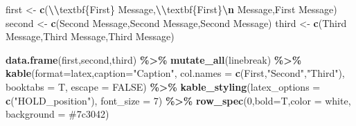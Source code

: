 \documentclass[
  9pt,
  t]{article}
\newenvironment{Shaded}{\begin{snugshade}}{\end{snugshade}}
\newcommand{\AttributeTok}[1]{\textcolor[rgb]{0.13,0.29,0.53}{#1}}
\newcommand{\ConstantTok}[1]{\textcolor[rgb]{0.56,0.35,0.01}{#1}}
\newcommand{\DecValTok}[1]{\textcolor[rgb]{0.00,0.00,0.81}{#1}}
\newcommand{\FunctionTok}[1]{\textcolor[rgb]{0.13,0.29,0.53}{\textbf{#1}}}
\newcommand{\NormalTok}[1]{#1}
\newcommand{\OtherTok}[1]{\textcolor[rgb]{0.56,0.35,0.01}{#1}}
\newcommand{\SpecialCharTok}[1]{\textcolor[rgb]{0.81,0.36,0.00}{\textbf{#1}}}
\newcommand{\StringTok}[1]{\textcolor[rgb]{0.31,0.60,0.02}{#1}}
\begin{document}
\begin{Shaded}
\begin{Highlighting}[]
\NormalTok{first }\OtherTok{\textless{}{-}} \FunctionTok{c}\NormalTok{(}\StringTok{\textquotesingle{}}\SpecialCharTok{\textbackslash{}\textbackslash{}}\StringTok{textbf\{First\} Message\textquotesingle{}}\NormalTok{,}\StringTok{\textquotesingle{}}\SpecialCharTok{\textbackslash{}\textbackslash{}}\StringTok{textbf\{First\}}\SpecialCharTok{\textbackslash{}n}\StringTok{ Message\textquotesingle{}}\NormalTok{,}\StringTok{\textquotesingle{}First Message\textquotesingle{}}\NormalTok{)}
\NormalTok{second }\OtherTok{\textless{}{-}} \FunctionTok{c}\NormalTok{(}\StringTok{\textquotesingle{}Second Message\textquotesingle{}}\NormalTok{,}\StringTok{\textquotesingle{}Second Message\textquotesingle{}}\NormalTok{,}\StringTok{\textquotesingle{}Second Message\textquotesingle{}}\NormalTok{)}
\NormalTok{third }\OtherTok{\textless{}{-}} \FunctionTok{c}\NormalTok{(}\StringTok{\textquotesingle{}Third Message\textquotesingle{}}\NormalTok{,}\StringTok{\textquotesingle{}Third Message\textquotesingle{}}\NormalTok{,}\StringTok{\textquotesingle{}Third Message\textquotesingle{}}\NormalTok{)}

\FunctionTok{data.frame}\NormalTok{(first,second,third) }\SpecialCharTok{\%\textgreater{}\%}
  \FunctionTok{mutate\_all}\NormalTok{(linebreak) }\SpecialCharTok{\%\textgreater{}\%}
  \FunctionTok{kable}\NormalTok{(}\AttributeTok{format=}\StringTok{\textquotesingle{}latex\textquotesingle{}}\NormalTok{,}\AttributeTok{caption=}\StringTok{"Caption"}\NormalTok{,}
        \AttributeTok{col.names =} \FunctionTok{c}\NormalTok{(}\StringTok{\textquotesingle{}First\textquotesingle{}}\NormalTok{,}\StringTok{"Second"}\NormalTok{,}\StringTok{"Third"}\NormalTok{), }\AttributeTok{booktabs =}\NormalTok{ T, }\AttributeTok{escape =} \ConstantTok{FALSE}\NormalTok{) }\SpecialCharTok{\%\textgreater{}\%} 
  \FunctionTok{kable\_styling}\NormalTok{(}\AttributeTok{latex\_options =} \FunctionTok{c}\NormalTok{(}\StringTok{"HOLD\_position"}\NormalTok{), }\AttributeTok{font\_size =} \DecValTok{7}\NormalTok{) }\SpecialCharTok{\%\textgreater{}\%} 
  \FunctionTok{row\_spec}\NormalTok{(}\DecValTok{0}\NormalTok{,}\AttributeTok{bold=}\NormalTok{T,}\AttributeTok{color =} \StringTok{\textquotesingle{}white\textquotesingle{}}\NormalTok{, }\AttributeTok{background =} \StringTok{\textquotesingle{}\#7c3042\textquotesingle{}}\NormalTok{) }
\end{Highlighting}
\end{Shaded}
\end{document}
